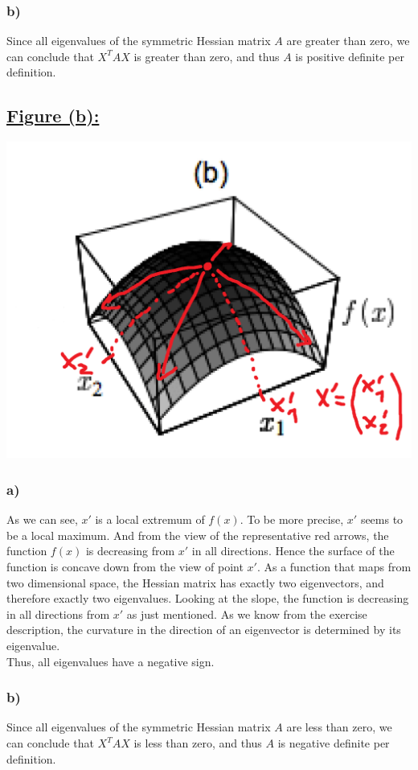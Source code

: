 \documentclass[a4paper]{article}
\begin{document}
        \subsubsection*{b)}
            Since all eigenvalues of the symmetric Hessian matrix $A$ are greater than zero, we can conclude that $X^T A X$ is greater than zero, and thus $A$ is positive definite per definition.


\newpage
    \subsection*{\underline{Figure (b):}}
        \includegraphics[width=0.8\linewidth]{Assignment 5/2.png}
        \subsubsection*{a)}
            As we can see, $x'$ is a local extremum of $f(x)$. To be more precise, $x'$ seems to be a local maximum.
            And from the view of the representative red arrows, the function $f(x)$ is decreasing from $x'$ in all directions.
            Hence the surface of the function is concave down from the view of point $x'$.
            As a function that maps from two dimensional space, the Hessian matrix has exactly two eigenvectors, and therefore exactly two eigenvalues.
            Looking at the slope, the function is decreasing in all directions from $x'$ as just mentioned.
            As we know from the exercise description, the curvature in the direction of an eigenvector is determined by its eigenvalue.\\
            Thus, all eigenvalues have a negative sign.

        \subsubsection*{b)}
            Since all eigenvalues of the symmetric Hessian matrix $A$ are less than zero, we can conclude that $X^T A X$ is less than zero, and thus $A$ is negative definite per definition.
\end{document}
